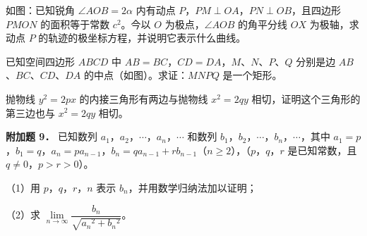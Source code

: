 \begin{question}
如图：已知锐角 $\angle AOB=2\alpha$ 内有动点 $P$，$PM\perp OA$，$PN\perp OB$，且四边形 $PMON$ 的面积等于常数 $c^2$。今以 $O$ 为极点，$\angle AOB$ 的角平分线 $OX$ 为极轴，求动点 $P$ 的轨迹的极坐标方程，并说明它表示什么曲线。
\nopagebreak[4]
\begin{center}\end{center}
\nopagebreak[4]
\Needspace{0.4\textheight}
\end{question}
\begin{question}
已知空间四边形 $ABCD$ 中 $AB=BC$，$CD=DA$，$M$、$N$、$P$、$Q$ 分别是边 $AB$、$BC$、$CD$、$DA$ 的中点（如图）。求证：$MNPQ$ 是一个矩形。
\nopagebreak[4]
\begin{center}\end{center}
\nopagebreak[4]
\end{question}
\begin{question}
抛物线 $y^2=2px$ 的内接三角形有两边与抛物线 $x^2=2qy$ 相切，证明这个三角形的第三边也与 $x^2=2qy$ 相切。

\textbf{附加题 9．} 已知数列 $a_1$，$a_2$，$\cdots$，$a_n$，$\cdots$ 和数列 $b_1$，$b_2$，$\cdots$，$b_n$，$\cdots$，其中 $a_1=p$，$b_1=q$，$a_n=pa_{n-1}$，$b_n=qa_{n-1}+rb_{n-1}$（$n\geqslant2$），（$p$，$q$，$r$ 是已知常数，且 $q\ne0$，$p>r>0$）。

（1）用 $p$，$q$，$r$，$n$ 表示 $b_n$，并用数学归纳法加以证明；

（2）求 $\lim\limits_{n\to\infty}\dfrac{b_n}{\sqrt{a_n{}^2+b_n{}^2}}$。

\end{question}